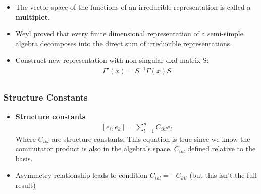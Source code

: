 \begin{itemize}
\begin{itemize}
    \item The vector space of the functions of an irreducible representation is called a \textbf{multiplet}. \cite{pfeifer}
    \item Weyl proved that every finite dimensional representation of a semi-simple algebra decomposes into the direct sum of irreducible representations. \cite{pfeifer}
    \item Construct new representation with non-singular dxd matrix S: \cite{pfeifer}
    \begin{equation}\begin{split}
    \Gamma'(x)=S^{-1}\Gamma(x)S \\
    \end{split}\end{equation}
\end{itemize}

\subsubsection{Structure Constants}
\begin{itemize}
    \item \textbf{Structure constants} \cite{pfeifer}
    \begin{equation}\begin{split}
    [e_i,e_k]=\sum_{l=1}^nC_{ikl}e_l
    \end{split}\end{equation}
    Where $C_{ikl}$ are structure constants. This equation is true since we know the commutator product is also in the algebra's space. $C_{ikl}$ defined relative to the basis.
    \item Asymmetry relationship leads to condition $C_{ikl}=-C_{kil}$ (but this isn't the full result) \cite{pfeifer}
\end{itemize}


\end{itemize}
